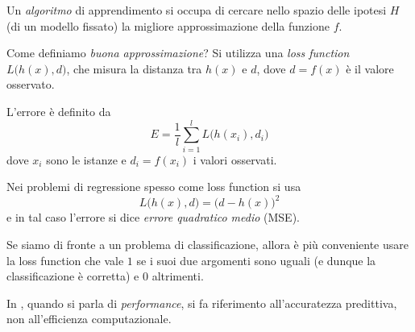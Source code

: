 \begin{definition}
Un \emph{algoritmo} di apprendimento si occupa di cercare nello spazio delle ipotesi $H$ (di un modello fissato) la migliore approssimazione della funzione $f$.
\end{definition}

Come definiamo \emph{buona approssimazione}? Si utilizza una \emph{loss function} $L\big(h(x),d\big)$, che misura la distanza tra $h(x)$ e $d$, dove $d=f(x)$ è il valore osservato.

\begin{definition}[Errore]
L'errore è definito da
\begin{equation}
E=\frac 1l\sum_{i=1}^{l}L\big(h(x_i),d_i\big)
\end{equation}
dove $x_i$ sono le istanze e $d_i=f(x_i)$ i valori osservati.
\end{definition}

\begin{example}
Nei problemi di regressione spesso come loss function si usa \begin{equation}
L\big(h(x),d\big)=\big(d-h(x)\big)^2
\end{equation}
e in tal caso l'errore si dice \emph{errore quadratico medio} (MSE).

Se siamo di fronte a un problema di classificazione, allora è più conveniente usare la loss function che vale $1$ se i suoi due argomenti sono uguali (e dunque la classificazione è corretta) e $0$ altrimenti.
\end{example}

\begin{remark}
In \ml, quando si parla di \emph{performance}, si fa riferimento all'accuratezza predittiva, non all'efficienza computazionale.
\end{remark}
